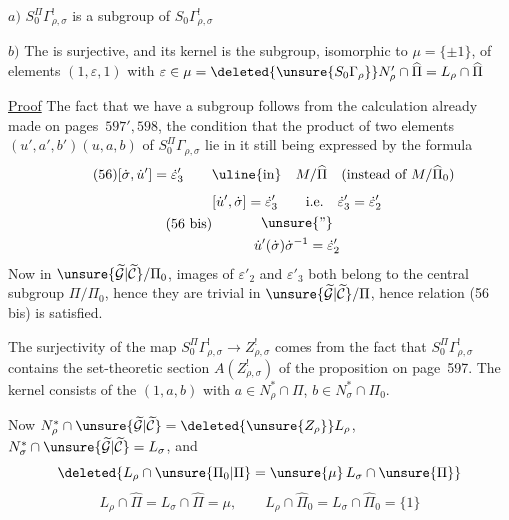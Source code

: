 $a)$ $S_0^\Pi\Gamma_{\rho,\sigma}^{!}$ is a subgroup of
$S_0\Gamma_{\rho,\sigma}^{!}$

$b)$ The  
is surjective, and its kernel is the subgroup, isomorphic to
$\mu=\{\pm1\}$, of elements $(1,\varepsilon,1)$ with
$\varepsilon\in\mu=\deleted{\unsure{S_0\Gamma_{\rho}}}
N'_\rho\cap\widehat\Pi=L_\rho\cap\widehat\Pi$


\uline{Proof} The fact that we have a subgroup follows from the calculation already made on pages\ $597',598$, the condition that the product of two elements $(u',a',b')(u,a,b)$ of $S_0^{\Pi}\Gamma_{\rho,\sigma}$ lie in it still being expressed by the formula
\[
\tag{56}
[\dot\sigma,\dot u']=\dot\varepsilon'_3
\qquad\text{\uline{in}}\quad M/\widehat\Pi
\quad(\text{instead of }M/\widehat\Pi_0)
\]
\[
\tag{56 bis}
\begin{gathered}
[\dot u',\dot\sigma]=\dot\varepsilon'_3
\qquad\text{i.e.}\quad \dot\varepsilon'_3=\dot\varepsilon'_2\\
\unsure{\text{''}}\\
\dot u'(\dot\sigma)\dot\sigma^{-1}=\dot\varepsilon'_2
\end{gathered}
\]
Now in $\unsure{\widetilde{\mathcal G}|\widetilde{\mathcal C}}/\Pi_0$,  images of $\varepsilon'_2$ and $\varepsilon'_3$ both belong to the central subgroup $\Pi/\Pi_0$, hence they are trivial in $\unsure{\widetilde{\mathcal G}|\widetilde{\mathcal C}}/\Pi$, hence relation (56 bis) is  satisfied.

The surjectivity of the map $S_0^\Pi\Gamma^!_{\rho,\sigma}\longrightarrow Z^!_{\rho,\sigma}$ comes from the fact that $S_0^\Pi\Gamma^!_{\rho,\sigma}$ contains the set-theoretic section $A(Z^!_{\rho,\sigma})$ of the proposition on page\ 597. The kernel consists of the  $(1,a,b)$ with $a\in N_\rho^*\cap\Pi$, $b\in N_\sigma^*\cap\Pi_0$.

Now $N_\rho^*\cap\unsure{\widetilde{\mathcal G}|\widetilde{\mathcal C}}=\deleted{\unsure{Z_\rho}}L_\rho$, $N_\sigma^*\cap\unsure{\widetilde{\mathcal G}|\widetilde{\mathcal C}}=L_\sigma$, and
\[
\deleted{L_\rho\cap\unsure{\Pi_0|\Pi}=\unsure{\mu}\,L_\sigma\cap\unsure{\Pi}}
\]
\[
\tag{57}
L_\rho\cap\widehat\Pi=L_\sigma\cap\widehat\Pi=\mu,
\qquad L_\rho\cap\widehat\Pi_0=L_\sigma\cap\widehat\Pi_0=\{1\}
\]

